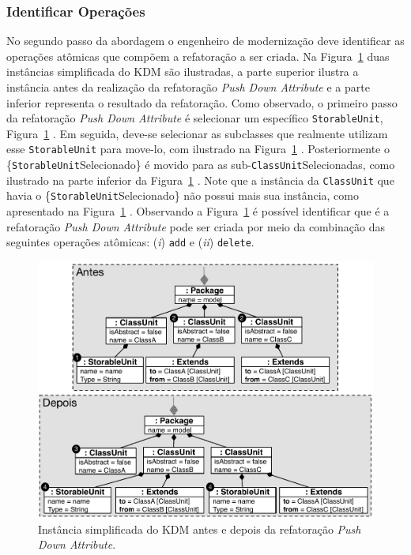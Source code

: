 \subsubsection{Identificar Operações}
No segundo passo da abordagem o engenheiro de modernização deve identificar as operações atômicas que compõem a refatoração a ser criada. Na Figura~\ref{fig:antes_e_depois_pushDown_StorableUnit} duas instâncias simplificada do KDM são ilustradas, a parte superior ilustra a instância antes da realização da refatoração \textit{Push Down Attribute} e a parte inferior representa o resultado da refatoração. Como observado, o primeiro passo da refatoração \textit{Push Down Attribute} é selecionar um específico \texttt{StorableUnit}, Figura~\ref{fig:antes_e_depois_pushDown_StorableUnit} . Em seguida, deve-se selecionar as subclasses que realmente utilizam esse \texttt{StorableUnit} para move-lo, com ilustrado na Figura~\ref{fig:antes_e_depois_pushDown_StorableUnit} . Posteriormente o \{\texttt{StorableUnit}Selecionado\} é movido para as sub-\texttt{ClassUnit}Selecionadas, como ilustrado na parte inferior da Figura~\ref{fig:antes_e_depois_pushDown_StorableUnit} . Note que a instância da \texttt{ClassUnit} que havia o \{\texttt{StorableUnit}Selecionado\} não possui mais sua instância, como apresentado na Figura~\ref{fig:antes_e_depois_pushDown_StorableUnit} . Observando a Figura~\ref{fig:antes_e_depois_pushDown_StorableUnit} é possível identificar que é a refatoração \textit{Push Down Attribute} pode ser criada por meio da combinação das seguintes operações atômicas: (\textit{i}) \texttt{add} e (\textit{ii}) \texttt{delete}. 

\begin{figure}[h]
	\centering
	\caption{Instância simplificada do KDM antes e depois da refatoração \textit{Push Down Attribute}.}
	\label{fig:antes_e_depois_pushDown_StorableUnit}
	\includegraphics[scale=0.6]{images/pushDownStorableUnitAntesDepois2}
	\fautor
\end{figure}

